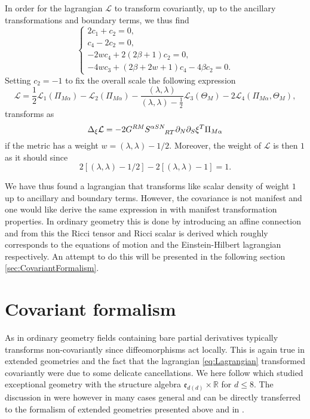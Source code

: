 In order for the lagrangian $\mathcal{L}$ to transform covariantly, up to the ancillary transformations and boundary terms, we thus find 
\begin{equation}
    \begin{cases}
        2c_1+c_2 = 0,\\
        c_4-2c_2 = 0,\\
        -2wc_4+2(2\beta+1)c_2 = 0,\\
        -4wc_3+(2\beta+2w+1)c_4-4\beta c_2 = 0.
    \end{cases}
\end{equation}
Setting $c_2=-1$ to fix the overall scale the following expression
\begin{equation}\label{eq:Lagrangian}
    \mathcal{L} = \frac{1}{2}\mathcal{L}_1(\Pi_{M\alpha})-\mathcal{L}_2(\Pi_{M\alpha})-\frac{(\lambda,\lambda)}{(\lambda,\lambda)-\frac{1}{2}}\mathcal{L}_3(\Theta_M)-2\mathcal{L}_4(\Pi_{M\alpha},\Theta_M),
\end{equation}
transforms as 
\begin{equation}
    \Delta_\xi \mathcal{L} = -2G^{RM}\tensor{S}{^{\alpha SN}_{RT}}\pd_N\pd_S\xi^T\Pi_{M\alpha}
\end{equation}
if the metric has a weight $w=(\lambda,\lambda)-1/2$. Moreover, the weight of $\mathcal{L}$ is then $1$ as it should since 
\begin{equation}
    2[(\lambda,\lambda)-1/2]-2[(\lambda,\lambda)-1] = 1. 
\end{equation}

We have thus found a lagrangian that transforms like scalar density of weight $1$ up to ancillary and boundary terms. However, the covariance is not manifest and one would like derive the same expression in with manifest transformation properties. In ordinary geometry this is done by introducing an affine connection and from this the Ricci tensor and Ricci scalar is derived which roughly corresponds to the equations of motion and the Einstein-Hilbert lagrangian respectively. An attempt to do this will be presented in the following section \ref{sec:CovariantFormalism}. 

\section{Covariant formalism\label{sec:CovariantFormalism}}
As in ordinary geometry fields containing bare partial derivatives typically transforms non-covariantly since diffeomorphisms act locally. This is again true in extended geometries and the fact that the lagrangian \eqref{eq:Lagrangian} transformed covariantly were due to some delicate cancellations. We here follow \cite{Cederwall:2013naa} which studied exceptional geometry with the structure algebra $\mathfrak{e}_{d(d)}\times\mathbb{R}$ for $d\leq 8$. The discussion in \cite{Cederwall:2013naa} were however in many cases general and can be directly transferred to the formalism of extended geometries presented above and in \cite{CederwallPalmkvist2017}.

